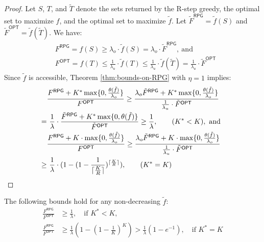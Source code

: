 \begin{proof}
Let $S$, $T$, and $\tilde{T}$ denote the sets returned by the R-step greedy, the optimal set to maximize $f$, and the optimal set to maximize $\tilde{f}$. Let ${{\tilde{F}}^{\textsf{RPG}}} = \tilde{f}(S)$ and ${\tilde{F}^{\textsf{OPT}}} = \tilde{f}(\tilde{T})$. We have:
\begin{align*}
&F^{\textsf{RPG}} = f(S) \geq \lambda_o \cdot \tilde{f}(S) = \lambda_o \cdot {\tilde{F}}^{\textsf{RPG}}, ~\text{and}~ \\ &F^{\textsf{OPT}} = f(T) \leq \frac{1}{\lambda_u} \cdot \tilde{f}(T) \leq \frac{1}{\lambda_u} \cdot \tilde{f}(\tilde{T}) = \frac{1}{\lambda_u} \cdot {\tilde{F}^{\textsf{OPT}}}
\end{align*}
Since $\tilde{f}$ is accessible, Theorem \ref{thm:bounds-on-RPG} with $\eta = 1$ implies: 
\begin{align*}
& \frac{F^{\textsf{RPG}} + K^* \max \{ 0, \frac{\theta(\tilde{f})}{\lambda_o} \}}{F^{\textsf{OPT}}} \geq \frac{\lambda_o {\tilde{F}}^{\textsf{RPG}} + K^* \max \{ 0, \frac{\theta(\tilde{f})}{\lambda_o} \}}{\frac{1}{\lambda_u} \cdot {\tilde{F}^{\textsf{OPT}}}}  \\
=&~ \frac{1}{\lambda} \cdot \frac{{\tilde{F}}^{\textsf{RPG}} + K^* \max \{ 0, {\theta(\tilde{f})} \}}{{\tilde{F}^{\textsf{OPT}}}} \geq \frac{1}{\lambda}, ~~~~~~ (K^* < K), ~\text{and}~ \\
&\frac{F^{\textsf{RPG}} + K \cdot \max \{ 0, \frac{\theta(\tilde{f})}{\lambda_o} \}}{F^{\textsf{OPT}}} \geq \frac{\lambda_o {\tilde{F}}^{\textsf{RPG}} + K \cdot \max \{ 0, \frac{\theta(\tilde{f})}{\lambda_o} \}}{\frac{1}{\lambda_u} \cdot {\tilde{F}^{\textsf{OPT}}}} \\
\geq&~ \frac{1}{\lambda} \cdot ( 1 - (1 - \frac{1}{{\lceil \frac{K}{R} \rceil}})^{\lceil \frac{K}{R} \rceil}), ~~~~~~ (K^* = K) ~~~~~~~~~~~~~~~~~~~~~~ \mbox{\qedhere}
\end{align*}
\end{proof}
The following bounds hold for any non-decreasing $\tilde{f}$:
\begin{equation*}
\begin{aligned}
\frac{F^{\textsf{RPG}}}{F^{\textsf{OPT}}} &\geq \frac{1}{\lambda}, \quad \text{if } K^* < K, \\
\frac{F^{\textsf{RPG}}}{F^{\textsf{OPT}}} &\geq \frac{1}{\lambda} \left(1 - \left(1 - \frac{1}{K}\right)^K\right) > \frac{1}{\lambda}  (1 - e^{-1}), \quad \text{if } K^* = K
\end{aligned}
\end{equation*}
